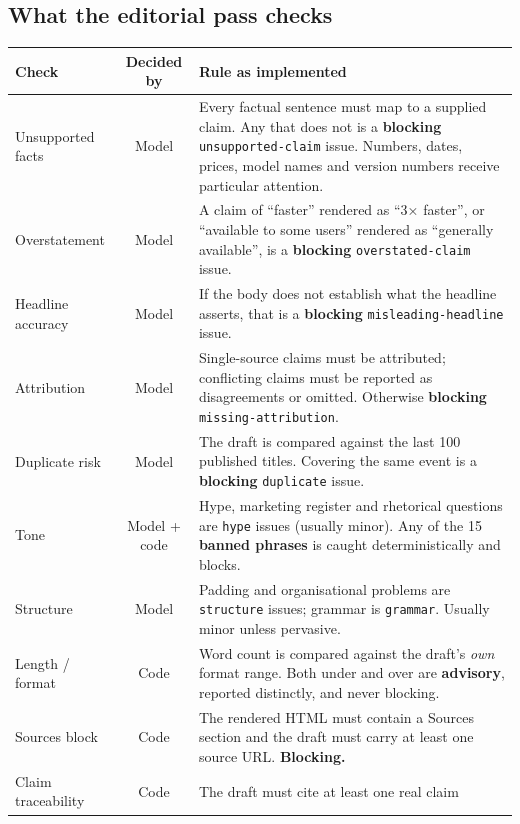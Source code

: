 \documentclass[11pt,a4paper]{article}
\newcommand{\brk}{\hyphenpenalty=0\exhyphenpenalty=0\relax}
\newcommand{\code}[1]{\texttt{\small\brk #1}}
\begin{document}
\subsection{What the editorial pass checks}

\begin{center}
\small
\begin{tabularx}{\textwidth}{@{}p{3.5cm} c >{\RaggedRight}X@{}}
\toprule
\textbf{Check} & \textbf{Decided by} & \textbf{Rule as implemented} \\
\midrule
Unsupported facts & Model & Every factual sentence must map to a supplied claim.
  Any that does not is a \textbf{blocking} \code{unsupported-claim} issue. Numbers,
  dates, prices, model names and version numbers receive particular attention. \\
Overstatement & Model & A claim of ``faster'' rendered as ``3× faster'', or
  ``available to some users'' rendered as ``generally available'', is a
  \textbf{blocking} \code{overstated-claim} issue. \\
Headline accuracy & Model & If the body does not establish what the headline
  asserts, that is a \textbf{blocking} \code{misleading-headline} issue. \\
Attribution & Model & Single-source claims must be attributed; conflicting claims
  must be reported as disagreements or omitted. Otherwise \textbf{blocking}
  \code{missing-attribution}. \\
Duplicate risk & Model & The draft is compared against the last 100 published
  titles. Covering the same event is a \textbf{blocking} \code{duplicate} issue. \\
Tone & Model + code & Hype, marketing register and rhetorical questions are
  \code{hype} issues (usually minor). Any of the 15 \textbf{banned phrases} is
  caught deterministically and blocks. \\
Structure & Model & Padding and organisational problems are \code{structure}
  issues; grammar is \code{grammar}. Usually minor unless pervasive. \\
Length / format & Code & Word count is compared against the draft's \emph{own}
  format range. Both under and over are \textbf{advisory}, reported distinctly, and
  never blocking. \\
Sources block & Code & The rendered HTML must contain a Sources section and the
  draft must carry at least one source URL. \textbf{Blocking.} \\
Claim traceability & Code & The draft must cite at least one real claim

\end{tabularx}
\end{center}
\end{document}
